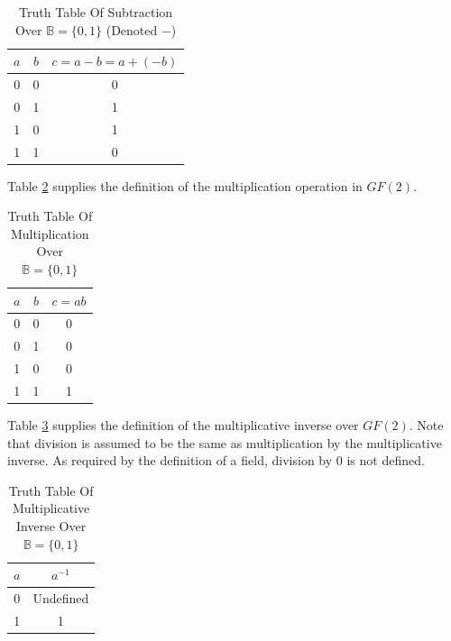 \begin{table}
\caption{Truth Table Of Subtraction Over $\mathbb{B}=\{ 0,1 \}$ (Denoted $-$)}
\label{tbl:cedc0:sfft0:dff0:04}
\begin{center}
\begin{tabular}{|c|c|c|}
\hline
$a$           &  $b$                  & $c = a - b = a + (-b)$     \\
\hline
\hline
0             & 0                     & 0                     \\
\hline
0             & 1                     & 1                     \\
\hline
1             & 0                     & 1                     \\
\hline
1             & 1                     & 0                     \\
\hline
\end{tabular}
\end{center}
\end{table}


Table \ref{tbl:cedc0:sfft0:dff0:05} supplies the definition of the 
multiplication operation in $GF(2)$.

\begin{table}
\caption{Truth Table Of Multiplication Over $\mathbb{B}=\{ 0,1 \}$}
\label{tbl:cedc0:sfft0:dff0:05}
\begin{center}
\begin{tabular}{|c|c|c|}
\hline
$a$           &  $b$                  & $c = a b$             \\
\hline
\hline
0             & 0                     & 0                     \\
\hline
0             & 1                     & 0                     \\
\hline
1             & 0                     & 0                     \\
\hline
1             & 1                     & 1                     \\
\hline
\end{tabular}
\end{center}
\end{table}

Table \ref{tbl:cedc0:sfft0:dff0:06} supplies the definition of the 
multiplicative inverse over $GF(2)$.  Note that division is assumed
to be the same as multiplication by the multiplicative inverse.
As required by the definition of a field, division by 0 is not
defined.

\begin{table}
\caption{Truth Table Of Multiplicative Inverse Over $\mathbb{B}=\{ 0,1 \}$}
\label{tbl:cedc0:sfft0:dff0:06}
\begin{center}
\begin{tabular}{|c|c|}
\hline
$a$           &  $a^{-1}$             \\
\hline
\hline
0             & Undefined             \\
\hline
1             & 1                     \\
\hline
\end{tabular}
\end{center}
\end{table}

